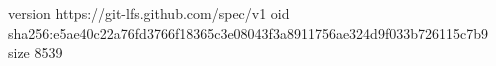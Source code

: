 version https://git-lfs.github.com/spec/v1
oid sha256:e5ae40c22a76fd3766f18365c3e08043f3a8911756ae324d9f033b726115c7b9
size 8539
